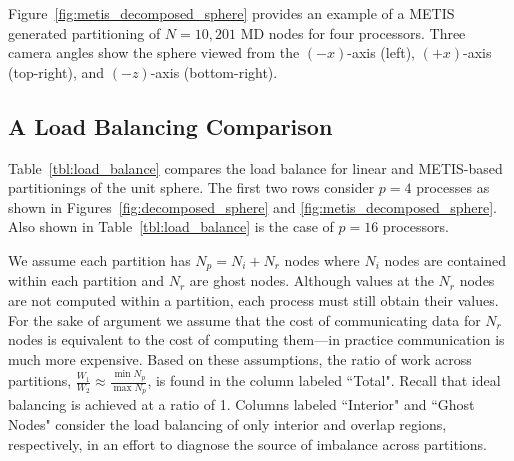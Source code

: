 \documentclass{report}
\begin{document}
Figure~\ref{fig:metis_decomposed_sphere} provides an example of a METIS generated partitioning of $N=10,201$ MD nodes for four processors. Three camera angles show the sphere viewed from the $(-x)$-axis (left), $(+x)$-axis (top-right), and $(-z)$-axis (bottom-right). 

\subsection{A Load Balancing Comparison}
Table~\ref{tbl:load_balance} compares the load balance for linear and METIS-based partitionings of the unit sphere. The first two rows consider $p=4$ processes as shown in Figures~\ref{fig:decomposed_sphere} and \ref{fig:metis_decomposed_sphere}. Also shown in Table~\ref{tbl:load_balance} is the case of $p=16$ processors. 

We assume each partition has $N_p = N_i + N_r$ nodes where $N_i$ nodes are contained within each partition and $N_r$ are ghost nodes. Although values at the $N_r$ nodes are not computed within a partition, each process must still obtain their values. For the sake of argument we assume that the cost of communicating data for $N_r$ nodes is equivalent to the cost of computing them---in practice communication is much more expensive. Based on these assumptions, the ratio of work across partitions, $\frac{W_1}{W_2} \approx \frac{\min N_p}{\max N_p}$, is found in the column labeled ``Total". Recall that ideal balancing is achieved at a ratio of 1. Columns labeled ``Interior" and ``Ghost Nodes" consider the load balancing of only interior and overlap regions, respectively, in an effort to diagnose the source of imbalance across partitions. 
\end{document}

